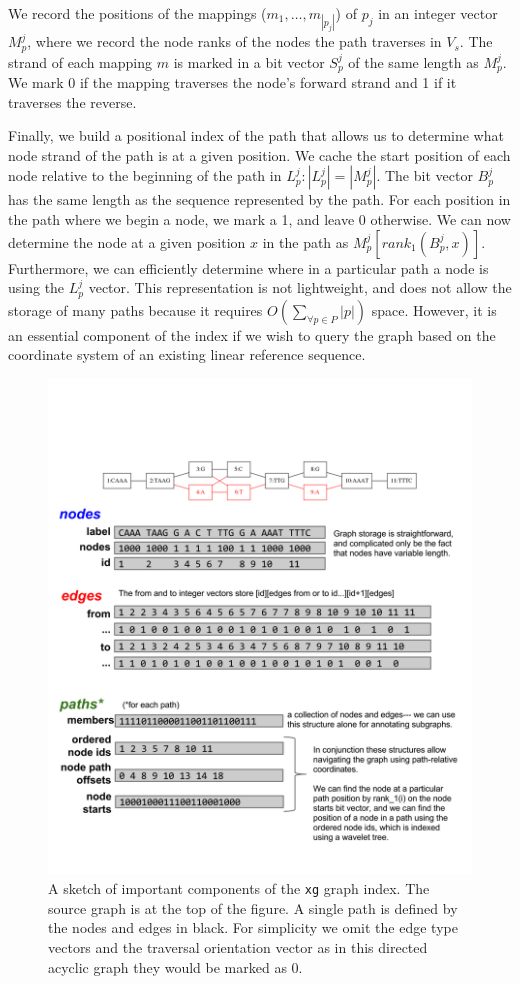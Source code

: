 \documentclass[12pt]{article}
\begin{document}
We record the positions of the mappings ($m_1, \ldots, m_{|p_j|}$) of $p_j$ in an integer vector $M_p^j$, where we record the node ranks of the nodes the path traverses in $V_s$.
The strand of each mapping $m$ is marked in a bit vector $S_p^j$ of the same length as $M_p^j$.
We mark 0 if the mapping traverses the node's forward strand and 1 if it traverses the reverse.

Finally, we build a positional index of the path that allows us to determine what node strand of the path is at a given position.
We cache the start position of each node relative to the beginning of the path in $L_p^j : |L_p^j| = |M_p^j|$.
The bit vector $B_p^j$ has the same length as the sequence represented by the path.
For each position in the path where we begin a node, we mark a 1, and leave 0 otherwise.
We can now determine the node at a given position $x$ in the path as $M_p^j[rank_1(B_p^j, x)]$.
Furthermore, we can efficiently determine where in a particular path a node is using the $L_p^j$ vector.
This representation is not lightweight, and does not allow the storage of many paths because it requires $O(\sum_{\forall p \in P}{|p|})$ space.
However, it is an essential component of the index if we wish to query the graph based on the coordinate system of an existing linear reference sequence.

\begin{figure}[t]
\centering
\includegraphics[width=1.0\textwidth]{figures/xg}
\caption{\label{fig:xg}
  A sketch of important components of the {\tt xg} graph index.
  The source graph is at the top of the figure.
  A single path is defined by the nodes and edges in black.
  For simplicity we omit the edge type vectors and the traversal orientation vector as in this directed acyclic graph they would be marked as 0.
}
\end{figure}
\end{document}
